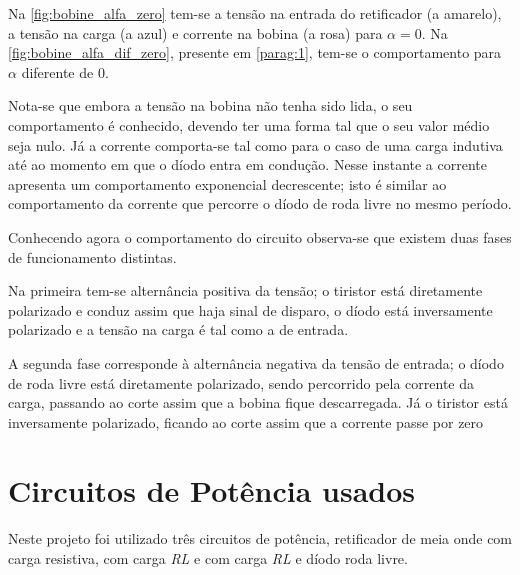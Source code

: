 \documentclass[a4paper,11pt]{article}
\numberwithin{equation}{section}
\begin{document}
Na \autoref{fig:bobine_alfa_zero} tem-se a tensão na entrada do retificador (a amarelo), a tensão na carga (a azul) e corrente na bobina (a rosa) para $\alpha = 0$. Na \autoref{fig:bobine_alfa_dif_zero}, presente em \autoref{parag:1}, tem-se o comportamento para $\alpha$ diferente de $0$.

Nota-se que embora a tensão na bobina não tenha sido lida, o seu comportamento é conhecido, devendo ter uma forma tal que o seu valor médio seja nulo. Já a corrente comporta-se tal como para o caso de uma carga indutiva até ao momento em que o díodo entra em condução. Nesse instante a corrente apresenta um comportamento exponencial decrescente; isto é similar ao comportamento da corrente que percorre o díodo de roda livre no mesmo período.

Conhecendo agora o comportamento do circuito observa-se que existem duas fases de funcionamento distintas.

Na primeira tem-se alternância positiva da tensão; o tiristor está diretamente polarizado e conduz assim que haja sinal de disparo, o díodo está inversamente polarizado e a tensão na carga é tal como a de entrada.

A segunda fase corresponde à alternância negativa da tensão de entrada; o díodo de roda livre está diretamente polarizado, sendo percorrido pela corrente da carga, passando ao corte assim que a bobina fique descarregada. Já o tiristor está inversamente polarizado, ficando ao corte assim que a corrente passe por zero

\section{Circuitos de Potência usados}
Neste projeto foi utilizado três circuitos de potência, retificador de meia onde com carga resistiva, com carga \textit{RL} e com carga \textit{RL} e díodo roda livre. 
\end{document}
